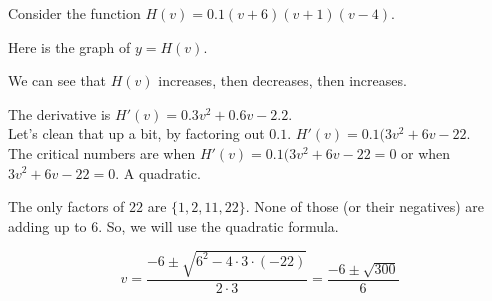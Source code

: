 \documentclass{ximera}
\begin{document}
\begin{example}

Consider the function $H(v) = 0.1(v+6)(v+1)(v-4)$.

Here is the graph of $y = H(v)$.








\begin{image}
\end{image}




We can see that $H(v)$ increases, then decreases, then increases.  


The derivative is $H'(v) = 0.3 v^2 + 0.6 v - 2.2$. \\

Let's clean that up a bit, by factoring out $0.1$. $H'(v) = 0.1(3 v^2 + 6 v - 22$. \\



The critical numbers are when $H'(v) = 0.1(3 v^2 + 6 v - 22 =0$ or when $3 v^2 + 6 v - 22 =0$.  A quadratic.


The only factors of $22$ are $\{ 1, 2, 11, 22    \}$.  None of those (or their negatives) are adding up to $6$.  So, we will use the quadratic formula.



\[  v = \frac{-6 \pm \sqrt{6^2 - 4 \cdot 3 \cdot (-22)}}{2 \cdot 3}  = \frac{-6 \pm \sqrt{300}}{6}    \]



\end{example}
\end{document}
